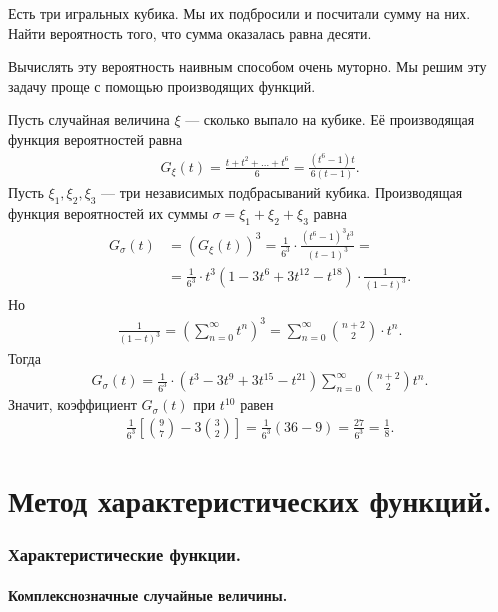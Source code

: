 \documentclass[../main.tex]{subfiles}
\begin{document}
\begin{exmpl}
 Есть три игральных кубика. Мы их подбросили и посчитали сумму на них. Найти вероятность того, что сумма оказалась равна десяти.

 Вычислять эту вероятность наивным способом очень муторно. Мы решим эту задачу проще с помощью производящих функций.

 Пусть случайная величина $ \xi $ --- сколько выпало на кубике. Её производящая функция вероятностей равна
 \begin{align*}
  G_\xi(t) = \frac{t + t^{2} + \ldots + t^{6}}{6} = \frac{(t^{6}-1)t}{6(t-1)}.
 \end{align*} Пусть $ \xi_1,\xi_2,\xi_3 $ --- три независимых подбрасываний кубика. Производящая функция вероятностей их суммы $ \sigma = \xi_1 + \xi_2 + \xi_3 $ равна
 \begin{align*}
  G_{\sigma}(t) &= (G_\xi(t))^{3} = \frac{1}{6^{3}} \cdot \frac{(t^{6}-1)^{3}t^{3}}{(t-1)^{3}} = \\
  &= \frac{1}{6^{3}} \cdot t^{3}(1 - 3t^{6} + 3t^{12} - t^{18}) \cdot \frac{1}{(1-t)^{3}}.
 \end{align*} Но
 \begin{align*}
  \frac{1}{(1-t)^{3}} = \left( \sum_{n=0}^{\infty}t^{n} \right)^{3} = \sum_{n=0}^{\infty} \binom {n+2} 2 \cdot t^{n}.
 \end{align*} Тогда
 \begin{align*}
  G_{\sigma}(t) =\frac{1}{6^{3}} \cdot (t^{3}-3t^{9}+3t^{15}-t^{21}) \sum_{n=0}^{\infty}\binom {n+2} 2 t^{n}.
 \end{align*} Значит, коэффициент $ G_\sigma(t) $ при $ t^{10} $ равен
 \begin{align*}
  \frac{1}{6^{3}} \left[ \binom 9 7 - 3 \binom 3 2 \right] = \frac{1}{6^{3}} \left( 36 - 9 \right) = \frac{27}{6^{3}} = \frac{1}{8}.
 \end{align*}
\end{exmpl}

\newpage
\part{Метод характеристических функций.}

\section{Характеристические функции.}

\subsection{Комплекснозначные случайные величины.}
\end{document}
